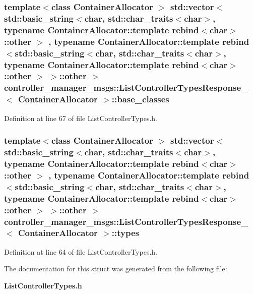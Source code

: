 \subsubsection[{base\-\_\-classes}]{\setlength{\rightskip}{0pt plus 5cm}template$<$class Container\-Allocator $>$ std\-::vector$<$std\-::basic\-\_\-string$<$char, std\-::char\-\_\-traits$<$char$>$, typename \-Container\-Allocator\-::template rebind$<$char$>$\-::other $>$ , typename \-Container\-Allocator\-::template rebind$<$std\-::basic\-\_\-string$<$char, std\-::char\-\_\-traits$<$char$>$, typename \-Container\-Allocator\-::template rebind$<$char$>$\-::other $>$ $>$\-::other $>$ {\bf controller\-\_\-manager\-\_\-msgs\-::\-List\-Controller\-Types\-Response\-\_\-}$<$ \-Container\-Allocator $>$\-::{\bf base\-\_\-classes}}\label{structcontroller__manager__msgs_1_1ListControllerTypesResponse___a423d48f91e4c29f3542b5a141f84f4a2}


\-Definition at line 67 of file \-List\-Controller\-Types.\-h.

\subsubsection[{types}]{\setlength{\rightskip}{0pt plus 5cm}template$<$class Container\-Allocator $>$ std\-::vector$<$std\-::basic\-\_\-string$<$char, std\-::char\-\_\-traits$<$char$>$, typename \-Container\-Allocator\-::template rebind$<$char$>$\-::other $>$ , typename \-Container\-Allocator\-::template rebind$<$std\-::basic\-\_\-string$<$char, std\-::char\-\_\-traits$<$char$>$, typename \-Container\-Allocator\-::template rebind$<$char$>$\-::other $>$ $>$\-::other $>$ {\bf controller\-\_\-manager\-\_\-msgs\-::\-List\-Controller\-Types\-Response\-\_\-}$<$ \-Container\-Allocator $>$\-::{\bf types}}\label{structcontroller__manager__msgs_1_1ListControllerTypesResponse___ab5693e97a6807ba63145f9956342d2a8}


\-Definition at line 64 of file \-List\-Controller\-Types.\-h.



\-The documentation for this struct was generated from the following file\-:\begin{DoxyCompactItemize}
\item 
{\bf \-List\-Controller\-Types.\-h}\end{DoxyCompactItemize}
